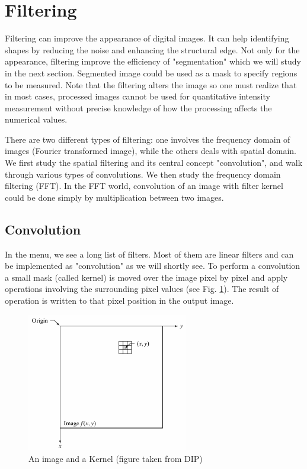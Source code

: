 
\section{Filtering}

Filtering can improve the appearance of digital images. It can help  identifying shapes by reducing the noise and enhancing the
structural edge. Not only for the appearance, filtering improve the
efficiency of "segmentation" which we
will study in the next section. Segmented image could be used as a mask
to specify regions to be measured. Note that the filtering alters the
image so one must realize that in most cases, processed images cannot
be used for quantitative intensity measurement without precise
knowledge of how the processing affects the numerical values. 

There are two different types of filtering: one involves the frequency
domain of images (Fourier transformed image), while the others deals
with spatial domain. We first study the spatial filtering and
its central concept "convolution", and
walk through various types of convolutions. We then study the frequency
domain filtering (FFT). In the FFT world, convolution of an image with
filter kernel could be done simply by multiplication between two
images. 



\subsection{Convolution}\label{subsecConvolution}

In the \ijmenu{[Process]} menu, we see a long list of
filters. Most of them are linear filters and can be implemented as "convolution" as we will shortly see. 
To perform a convolution a small mask (called kernel) is moved over the image pixel by pixel and apply operations involving the surrounding pixel values (see Fig.
\ref{fig:img38}). The result of operation is written to that pixel position
in the output image. 

\begin{figure}[htbp]
\begin{center}
\includegraphics[width=7cm]{fig/CMCIBasicCourse201102-img38.png}
\caption{ An image and a Kernel (figure taken from DIP)}
\label{fig:img38}
\end{center}
\end{figure}


